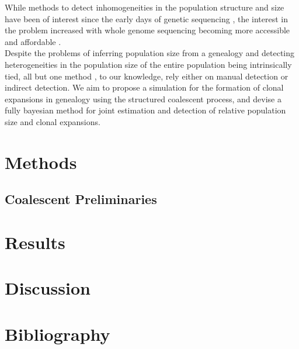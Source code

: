 \documentclass{report}
\theoremstyle{definition}
\begin{document}
While methods to detect inhomogeneities in the population structure and size have been of interest since the early days of genetic sequencing \cite{smith_how_1993,spratt_displaying_2004}, the interest in the problem increased with whole genome sequencing becoming more accessible and affordable \cite{holden_genomic_2013,dearlove_measuring_2015,eldholm_four_2015}.\\
Despite the problems of inferring population size from a genealogy and detecting heterogeneities in the population size of the entire population being intrinsically tied, all but one method \cite{volz_identification_nodate}, to our knowledge, rely either on manual detection or indirect detection. We aim to propose a simulation for the formation of clonal expansions in genealogy using the structured coalescent process, and devise a fully bayesian method for joint estimation and detection of relative population size and clonal expansions.
\chapter{Methods}
\section{Coalescent Preliminaries}
\chapter{Results}
\chapter{Discussion}
\chapter{Bibliography}
\printbibliography
\end{document}
